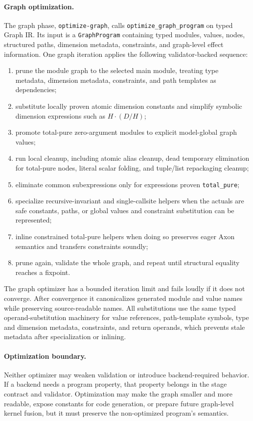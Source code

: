 \documentclass{article}
\newcommand{\code}[1]{\texttt{#1}}
\begin{document}
\paragraph{Graph optimization.}
The graph phase, \code{optimize-graph}, calls
\code{optimize\_graph\_program} on typed Graph IR.  Its input is a
\code{GraphProgram} containing typed modules, values, nodes, structured paths,
dimension metadata, constraints, and graph-level effect information.  One graph
iteration applies the following validator-backed sequence:
\begin{enumerate}
\item prune the module graph to the selected main module, treating type
metadata, dimension metadata, constraints, and path templates as dependencies;
\item substitute locally proven atomic dimension constants and simplify
symbolic dimension expressions such as \(H \cdot (D / H)\);
\item promote total-pure zero-argument modules to explicit model-global graph
values;
\item run local cleanup, including atomic alias cleanup, dead temporary
elimination for total-pure nodes, literal scalar folding, and tuple/list
repackaging cleanup;
\item eliminate common subexpressions only for expressions proven
\code{total\_pure};
\item specialize recursive-invariant and single-callsite helpers when the
actuals are safe constants, paths, or global values and constraint substitution
can be represented;
\item inline constrained total-pure helpers when doing so preserves eager Axon
semantics and transfers constraints soundly;
\item prune again, validate the whole graph, and repeat until structural
equality reaches a fixpoint.
\end{enumerate}
The graph optimizer has a bounded iteration limit and fails loudly if it does
not converge.  After convergence it canonicalizes generated module and value
names while preserving source-readable names.  All substitutions use the same
typed operand-substitution machinery for value references, path-template
symbols, type and dimension metadata, constraints, and return operands, which
prevents stale metadata after specialization or inlining.

\paragraph{Optimization boundary.}
Neither optimizer may weaken validation or introduce backend-required behavior.
If a backend needs a program property, that property belongs in the stage
contract and validator.  Optimization may make the graph smaller and more
readable, expose constants for code generation, or prepare future graph-level
kernel fusion, but it must preserve the non-optimized program's semantics.
\end{document}
